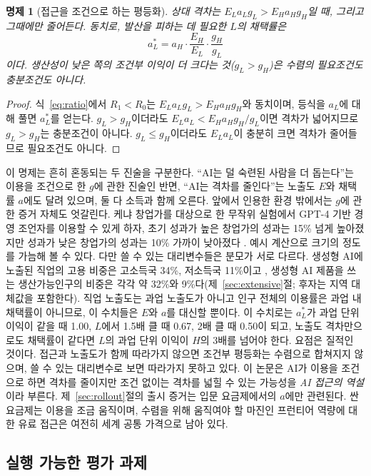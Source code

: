 \documentclass[11pt]{article}
\newtheorem{proposition}{명제}
\theoremstyle{definition}
\theoremstyle{remark}
\begin{document}
\begin{proposition}[접근을 조건으로 하는 평등화]\label{prop:equal}
상대 격차는 $E_L a_L g_L > E_H a_H g_H$일 때, 그리고 그때에만 줄어든다. 동치로, 발산을 피하는 데 필요한 $L$의 채택률은
\[
a_L^{*} = a_H \cdot \frac{E_H}{E_L}\cdot \frac{g_H}{g_L}
\]
이다. 생산성이 낮은 쪽의 조건부 이익이 더 크다는 것($g_L > g_H$)은 수렴의 필요조건도 충분조건도 아니다.
\end{proposition}
\begin{proof}
식~\eqref{eq:ratio}에서 $R_1<R_0$는 $E_La_Lg_L>E_Ha_Hg_H$와 동치이며, 등식을 $a_L$에 대해 풀면 $a_L^*$를 얻는다. $g_L>g_H$이더라도 $E_La_L<E_Ha_Hg_H/g_L$이면 격차가 넓어지므로 $g_L>g_H$는 충분조건이 아니다. $g_L\le g_H$이더라도 $E_La_L$이 충분히 크면 격차가 줄어들므로 필요조건도 아니다.
\end{proof}

이 명제는 흔히 혼동되는 두 진술을 구분한다. ``AI는 덜 숙련된 사람을 더 돕는다''는 이용을 조건으로 한 $g$에 관한 진술인 반면, ``AI는 격차를 줄인다''는 노출도 $E$와 채택률 $a$에도 달려 있으며, 둘 다 소득과 함께 오른다. 앞에서 인용한 환경 밖에서는 $g$에 관한 증거 자체도 엇갈린다. 케냐 창업가를 대상으로 한 무작위 실험에서 GPT-4 기반 경영 조언자를 이용할 수 있게 하자, 초기 성과가 높은 창업가의 성과는 15\% 넘게 높아졌지만 성과가 낮은 창업가의 성과는 10\% 가까이 낮아졌다 \citep{otis2025uneven}. 예시 계산으로 크기의 정도를 가늠해 볼 수 있다. 다만 쓸 수 있는 대리변수들은 분모가 서로 다르다. 생성형 AI에 노출된 직업의 고용 비중은 고소득국 34\%, 저소득국 11\%이고 \citep{gmyrek2025generative}, 생성형 AI 제품을 쓰는 생산가능인구의 비중은 각각 약 32\%와 9\%다(제~\ref{sec:extensive}절; 후자는 지역 대체값을 포함한다). 직업 노출도는 과업 노출도가 아니고 인구 전체의 이용률은 과업 내 채택률이 아니므로, 이 수치들은 $E$와 $a$를 대신할 뿐이다. 이 수치로는 $a_L^*$가 과업 단위 이익이 같을 때 1.00, $L$에서 1.5배 클 때 0.67, 2배 클 때 0.50이 되고, 노출도 격차만으로도 채택률이 같다면 $L$의 과업 단위 이익이 $H$의 3배를 넘어야 한다. 요점은 질적인 것이다. 접근과 노출도가 함께 따라가지 않으면 조건부 평등화는 수렴으로 합쳐지지 않으며, 쓸 수 있는 대리변수로 보면 따라가지 못하고 있다. 이 논문은 AI가 이용을 조건으로 하면 격차를 줄이지만 조건 없이는 격차를 넓힐 수 있는 가능성을 \emph{AI 접근의 역설}이라 부른다. 제~\ref{sec:rollout}절의 출시 증거는 입문 요금제에서의 $a$에만 관련된다. 싼 요금제는 이용을 조금 움직이며, 수렴을 위해 움직여야 할 마진인 프런티어 역량에 대한 유료 접근은 여전히 세계 공통 가격으로 남아 있다.

\subsection{실행 가능한 평가 과제}
\end{document}
